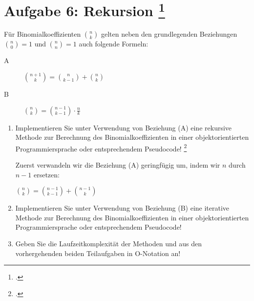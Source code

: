 \documentclass{lehramt-informatik-aufgabe}
\begin{document}

\section{Aufgabe 6: Rekursion
\footcite[Thema 2 Aufgabe 4]{examen:46115:2014:03}
}

Für Binomialkoeffizienten
$\binom{n}{k}$
gelten neben den grundlegenden Beziehungen
$\binom{n}{0} = 1$
und
$\binom{n}{n} = 1$
auch folgende Formeln:

\begin{description}
\item[A]
$
\binom{n+1}{k}
=
\binom{n}{k-1}
+
\binom{n}{k}
$
\item[B]
$
\binom{n}{k}
=
\binom{n-1}{k-1}
\cdot
\frac{n}{k}
$

\end{description}
\begin{enumerate}


\item Implementieren Sie unter Verwendung
von Beziehung (A) eine rekursive Methode  zur
Berechnung des Binomialkoeffizienten in einer objektorientierten
Programmiersprache oder entsprechendem Pseudocode!
\footcite[(entnommen aus Algorithmen und Datenstrukturen, Übungsblatt 2, Universität Würzburg), Aufgabe 6]{aud:pu:7}

\begin{liAntwort}
Zuerst verwandeln wir die Beziehung (A) geringfügig um, indem wir $n$
durch $n-1$ ersetzen:

$
\binom{n}{k}
=
\binom{n-1}{k-1}
+
\binom{n-1}{k}
$

\end{liAntwort}


\item Implementieren Sie unter Verwendung von Beziehung (B) eine
iterative Methode  zur
Berechnung des Binomialkoeffizienten in einer objektorientierten
Programmiersprache oder entsprechendem Pseudocode!

\begin{liAntwort}
\end{liAntwort}


\item Geben Sie die Laufzeitkomplexität der Methoden 
und  aus den vorhergehenden beiden Teilaufgaben in
O-Notation an!

\end{enumerate}

\end{document}

